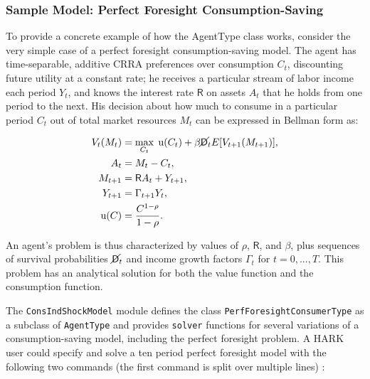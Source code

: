 \documentclass[10pt,twocolumn]{article}
\begin{document}
\subsubsection{Sample Model: Perfect Foresight
Consumption-Saving}\label{sample-model-perfect-foresight-consumption-saving}

To provide a concrete example of how the AgentType class works, consider
the very simple case of a perfect foresight consumption-saving model.
The agent has time-separable, additive CRRA preferences over consumption
\(C_t\), discounting future utility at a constant rate; he receives a
particular stream of labor income each period \(Y_t\), and knows the
interest rate \(\mathsf{R}\) on assets \(A_t\) that he holds from one
period to the next. His decision about how much to consume in a
particular period \(C_t\) out of total market resources \(M_t\) can be
expressed in Bellman form as:

\[
\begin{aligned}
V_t(M_t) &= \max_{C_t} \; \mathrm{u}(C_t)  + \beta  \cancel{\mathsf{D}}_t E [V_{t+1}(M_{t+1}) ], \\
A_t &= M_t - C_t, \\
M_{t+1} &= \mathsf{R} A_t + Y_{t+1}, \\
Y_{t+1} &= \Gamma_{t+1} Y_t, \\
\mathrm{u}(C) &= \frac{C^{1-\rho}}{1-\rho}.
\end{aligned}
\]

An agent's problem is thus characterized by values of \(\rho\),
\(\mathsf{R}\), and \(\beta\), plus sequences of survival probabilities
\(\cancel{\mathsf{D}}_t\) and income growth factors \(\Gamma_t\) for
\(t = 0, ... ,T\). This problem has an analytical solution for both the
value function and the consumption function.

The \texttt{ConsIndShockModel} module defines the class
\texttt{PerfForesightConsumerType} as a subclass of \texttt{AgentType}
and provides \texttt{solver} functions for several variations of a
consumption-saving model, including the perfect foresight problem. A
HARK user could specify and solve a ten period perfect foresight model
with the following two commands (the first command is split over
multiple lines) :
\end{document}
